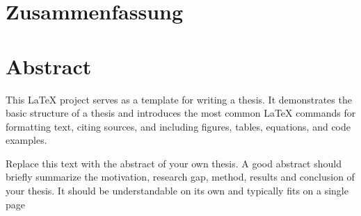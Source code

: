   {\chapter*{Zusammenfassung}}
  {\chapter*{Abstract}}


This \LaTeX{} project serves as a template for writing a thesis.
It demonstrates the basic structure of a thesis and introduces the most common \LaTeX{} commands for formatting text, citing sources, and including figures, tables, equations, and code examples.

Replace this text with the abstract of your own thesis. A good abstract should briefly summarize the motivation, research gap, method, results and conclusion of your thesis. It should be understandable on its own and typically fits on a single page